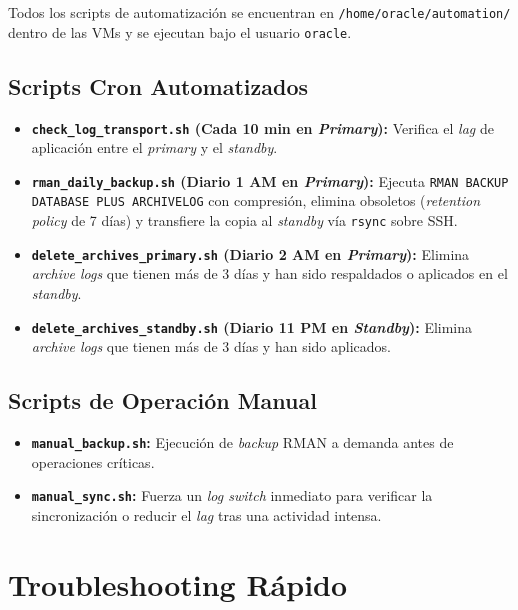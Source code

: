 \documentclass[11pt, a4paper]{report}
\begin{document}
Todos los scripts de automatización se encuentran en \texttt{/home/oracle/automation/} dentro de las VMs y se ejecutan bajo el usuario \texttt{oracle}.
\subsection{Scripts Cron Automatizados}

\begin{itemize}
    \item \textbf{\texttt{check\_log\_transport.sh} (Cada 10 min en \textit{Primary}):} Verifica el \textit{lag} de aplicación entre el \textit{primary} y el \textit{standby}.
\item \textbf{\texttt{rman\_daily\_backup.sh} (Diario 1 AM en \textit{Primary}):} Ejecuta \texttt{RMAN BACKUP DATABASE PLUS ARCHIVELOG} con compresión, elimina obsoletos (\textit{retention policy} de 7 días) y transfiere la copia al \textit{standby} vía \texttt{rsync} sobre SSH.
\item \textbf{\texttt{delete\_archives\_primary.sh} (Diario 2 AM en \textit{Primary}):} Elimina \textit{archive logs} que tienen más de 3 días y han sido respaldados o aplicados en el \textit{standby}.
\item \textbf{\texttt{delete\_archives\_standby.sh} (Diario 11 PM en \textit{Standby}):} Elimina \textit{archive logs} que tienen más de 3 días y han sido aplicados.
\end{itemize}

\subsection{Scripts de Operación Manual}

\begin{itemize}
    \item \textbf{\texttt{manual\_backup.sh}:} Ejecución de \textit{backup} RMAN a demanda antes de operaciones críticas.
    \item \textbf{\texttt{manual\_sync.sh}:} Fuerza un \textit{log switch} inmediato para verificar la sincronización o reducir el \textit{lag} tras una actividad intensa.
\end{itemize}

\section{Troubleshooting Rápido}
\end{document}
